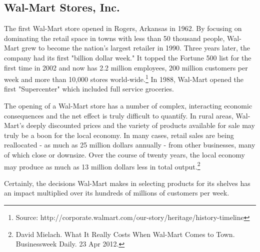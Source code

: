 \subsection{Wal-Mart Stores, Inc.}

The first Wal-Mart store opened in Rogers, Arkansas in 1962. By focusing on dominating the retail space in towns with less than 50 thousand people, Wal-Mart grew to become the nation's largest retailer in 1990.  Three years later, the company had its first "billion dollar week."  It topped the Fortune 500 list for the first time in 2002 and now has 2.2 million employees, 200 million customers per week and more than 10,000 stores world-wide.\footnote{Source: http://corporate.walmart.com/our-story/heritage/history-timeline} In 1988, Wal-Mart opened the first "Supercenter" which included full service groceries.

The opening of a Wal-Mart store has a number of complex, interacting economic consequences and the net effect is truly difficult to quantify.  In rural areas, Wal-Mart's deeply discounted prices and the variety of products available for sale may truly be a boon for the local economy.  In many cases, retail sales are being reallocated - as much as 25 million dollars annually - from other businesses, many of which close or downsize.  Over the course of twenty years, the local economy may produce as much as 13 million dollars less in total output.\footnote{David Mielach. What It Really Costs When Wal-Mart Comes to Town. Businessweek Daily. 23 Apr 2012.}

Certainly, the decisions Wal-Mart makes in selecting products for its shelves has an impact multiplied over its hundreds of millions of customers per week.